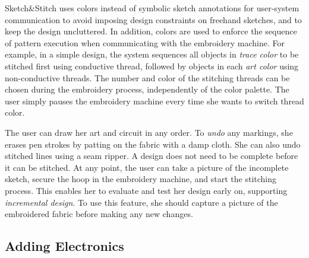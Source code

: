 \documentclass[header.tex]{subfiles}
\begin{document}
 


Sketch\&Stitch uses colors instead of symbolic sketch annotations for user-system communication to avoid imposing design constraints on freehand sketches, and to keep the design uncluttered. In addition, colors are used to enforce the sequence of pattern execution when communicating with the embroidery machine. For example, in a simple design, the system sequences all objects in \textit{trace color} to be stitched first using conductive thread, followed by objects in each \textit{art color} using non-conductive threads. The number and color of the stitching threads can be chosen during the embroidery process, independently of the color palette. The user simply pauses the embroidery machine every time she wants to switch thread color.


The user can draw her art and circuit in any order.
To \textit{undo} any markings, she erases pen strokes by patting on the fabric with a damp cloth. She can also undo stitched lines using a seam ripper. A design does not need to be complete before it can be stitched. At any point, the user can take a picture of the incomplete sketch, secure the hoop in the embroidery machine, and start the stitching process. This enables her to evaluate and test her design early on, supporting \textit{incremental design}. To use this feature, she should capture a picture of the embroidered fabric before making any new changes. 

\subsection{Adding Electronics}
\end{document}
